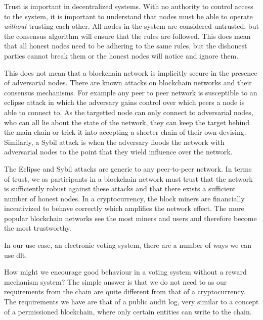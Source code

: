 Trust is important in decentralized systems. With no authority to control access to the system, it is important to understand that nodes must be able to operate \emph{without} trusting each other. All nodes in the system are considered untrusted, but the consensus algorithm will ensure that the rules are followed. This does mean that all honest nodes need to be adhering to the same rules, but the dishonest parties cannot break them or the honest nodes will notice and ignore them.

This does not mean that a blockchain network is implicitly secure in the presence of adversarial nodes. There are known attacks on blockchain networks and their consensus mechanisms. For example any peer to peer network is susceptible to an eclipse attack \cite{heilmanEclipseAttacksBitcoin2015} in which the adversary gains control over which peers a node is able to connect to. As the targetted node can only connect to adversarial nodes, who can all lie about the state of the network, they can keep the target behind the main chain or trick it into accepting a shorter chain of their own devising. Similarly, a Sybil attack \cite{douceurSybilAttack2002} is when the adversary floods the network with adversarial nodes to the point that they wield influence over the network.

The Eclipse and Sybil attacks are generic to any peer-to-peer network. In terms of trust, we as participants in a blockchain network must trust that the network is sufficiently robust against these attacks and that there exists a sufficient number of honest nodes. In a cryptocurrency, the block miners are financially incentivized to behave correctly which amplifies the network effect. The more popular blockchain networks see the most miners and users and therefore become the most trustworthy.

In our use case, an electronic voting system, there are a number of ways we can use \gls{dlt}.


How might we encourage good behaviour in a voting system without a reward mechanism system? The simple answer is that we do not need to as our requirements from the chain are quite different from that of a cryptocurrency. The requirements we have are that of a public audit log, very similar to a concept of a permissioned blockchain, where only certain entities can write to the chain.